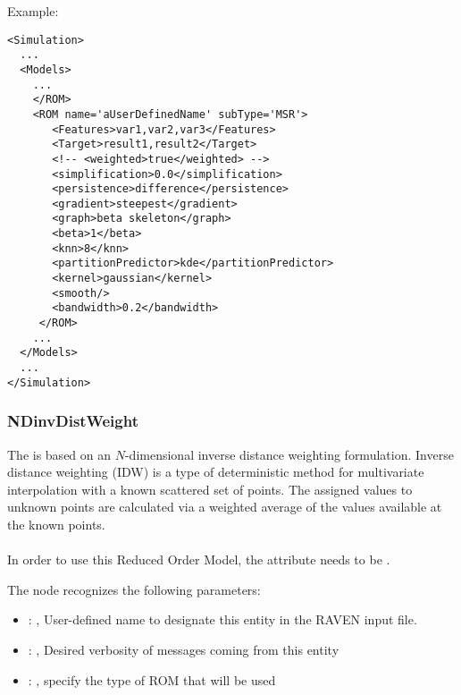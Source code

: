 \hspace{24pt}
Example:
\begin{lstlisting}[style=XML,morekeywords={name,subType}]
<Simulation>
  ...
  <Models>
    ...
    </ROM>
    <ROM name='aUserDefinedName' subType='MSR'>
       <Features>var1,var2,var3</Features>
       <Target>result1,result2</Target>
       <!-- <weighted>true</weighted> -->
       <simplification>0.0</simplification>
       <persistence>difference</persistence>
       <gradient>steepest</gradient>
       <graph>beta skeleton</graph>
       <beta>1</beta>
       <knn>8</knn>
       <partitionPredictor>kde</partitionPredictor>
       <kernel>gaussian</kernel>
       <smooth/>
       <bandwidth>0.2</bandwidth>
     </ROM>
    ...
  </Models>
  ...
</Simulation>
\end{lstlisting}


\subsubsection{NDinvDistWeight}
  The  is based on an                             $N$-dimensional inverse
  distance weighting formulation.                             Inverse distance weighting (IDW) is a
  type of deterministic method for                             multivariate interpolation with a
  known scattered set of points.                             The assigned values to unknown points
  are calculated via a weighted average of                             the values available at the
  known points.                             \\
                               \\
  In order to use this Reduced Order Model, the  attribute
   needs to be .

  The  node recognizes the following parameters:
    \begin{itemize}
      \item {}: , 
        User-defined name to designate this entity in the RAVEN input file.
      \item {}: , 
        Desired verbosity of messages coming from this entity
      \item {}: , 
        specify the type of ROM that will be used
  \end{itemize}

